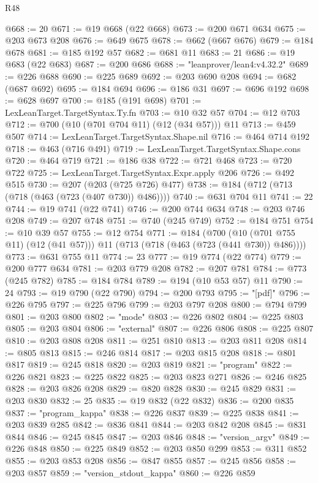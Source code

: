 \begin{lexlean}{R48}
\begin{coremodule}
@668 := 20
@671 := @19 @668 (@22 @668)
@673 := @200 @671 @634
@675 := @203 @673 @208
@676 := @649 @675
@678 := @662 (@667 @676)
@679 := @184 @678
@681 := @185 @192 @57
@682 := @681 @11
@683 := 21
@686 := @19 @683 (@22 @683)
@687 := @200 @686
@688 := "leanprover/lean4:v4.32.2"
@689 := @226 @688
@690 := @225 @689
@692 := @203 @690 @208
@694 := @682 (@687 @692)
@695 := @184 @694
@696 := @186 @31
@697 := @696 @192
@698 := @628 @697
@700 := @185 (@191 @698)
@701 := LexLeanTarget.TargetSyntax.Ty.fn
@703 := @10 @32 @57
@704 := @12 @703
@712 := @700 (@10 (@701 @704 @11) (@12 (@34 @57))) @11
@713 := @459 @507
@714 := LexLeanTarget.TargetSyntax.Shape.nil
@716 := @464 @714 @192
@718 := @463 (@716 @491)
@719 := LexLeanTarget.TargetSyntax.Shape.cons
@720 := @464 @719
@721 := @186 @38
@722 := @721 @468
@723 := @720 @722
@725 := LexLeanTarget.TargetSyntax.Expr.apply @206
@726 := @492 @515
@730 := @207 (@203 (@725 @726) @477)
@738 := @184 (@712 (@713 (@718 (@463 (@723 (@407 @730)) @486))))
@740 := @631 @704 @11
@741 := 22
@744 := @19 @741 (@22 @741)
@746 := @200 @744 @634
@748 := @203 @746 @208
@749 := @207 @748
@751 := @740 (@245 @749)
@752 := @184 @751
@754 := @10 @39 @57
@755 := @12 @754
@771 := @184
    (@700 (@10 (@701 @755 @11) (@12 (@41 @57))) @11 (@713 (@718 (@463 (@723 (@441 @730)) @486))))
@773 := @631 @755 @11
@774 := 23
@777 := @19 @774 (@22 @774)
@779 := @200 @777 @634
@781 := @203 @779 @208
@782 := @207 @781
@784 := @773 (@245 @782)
@785 := @184 @784
@789 := @194 (@10 @53 @57) @11
@790 := 24
@793 := @19 @790 (@22 @790)
@794 := @200 @793
@795 := "[pdf]"
@796 := @226 @795
@797 := @225 @796
@799 := @203 @797 @208
@800 := @794 @799
@801 := @203 @800
@802 := "mode"
@803 := @226 @802
@804 := @225 @803
@805 := @203 @804
@806 := "external"
@807 := @226 @806
@808 := @225 @807
@810 := @203 @808 @208
@811 := @251 @810
@813 := @203 @811 @208
@814 := @805 @813
@815 := @246 @814
@817 := @203 @815 @208
@818 := @801 @817
@819 := @245 @818
@820 := @203 @819
@821 := "program"
@822 := @226 @821
@823 := @225 @822
@825 := @203 @823 @271
@826 := @246 @825
@828 := @203 @826 @208
@829 := @820 @828
@830 := @245 @829
@831 := @203 @830
@832 := 25
@835 := @19 @832 (@22 @832)
@836 := @200 @835
@837 := "program_kappa"
@838 := @226 @837
@839 := @225 @838
@841 := @203 @839 @285
@842 := @836 @841
@844 := @203 @842 @208
@845 := @831 @844
@846 := @245 @845
@847 := @203 @846
@848 := "version_argv"
@849 := @226 @848
@850 := @225 @849
@852 := @203 @850 @299
@853 := @311 @852
@855 := @203 @853 @208
@856 := @847 @855
@857 := @245 @856
@858 := @203 @857
@859 := "version_stdout_kappa"
@860 := @226 @859

\end{coremodule}
\end{lexlean}
